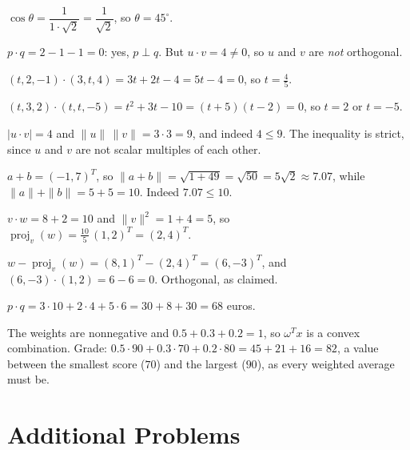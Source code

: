 \begin{solutions}
  \item $\cos \theta = \dfrac{1}{1 \cdot \sqrt{2}} = \dfrac{1}{\sqrt{2}}$,
        so $\theta = 45^{\circ}$.

  \item $p \cdot q = 2 - 1 - 1 = 0$: yes, $p \perp q$. But
        $u \cdot v = 4 \neq 0$, so $u$ and $v$ are \emph{not} orthogonal.

  \item $(t, 2, -1) \cdot (3, t, 4) = 3 t + 2 t - 4 = 5 t - 4 = 0$, so
        $t = \tfrac{4}{5}$.

  \item $(t, 3, 2) \cdot (t, t, -5) = t^{2} + 3 t - 10 = (t + 5)(t - 2)
        = 0$, so $t = 2$ or $t = -5$.

  \item $|u \cdot v| = 4$ and $\|u\| \, \|v\| = 3 \cdot 3 = 9$, and indeed
        $4 \le 9$. The inequality is strict, since $u$ and $v$ are not
        scalar multiples of each other.

  \item $a + b = (-1, 7)^{T}$, so
        $\|a + b\| = \sqrt{1 + 49} = \sqrt{50} = 5 \sqrt{2} \approx 7.07$,
        while $\|a\| + \|b\| = 5 + 5 = 10$. Indeed $7.07 \le 10$.

  \item $v \cdot w = 8 + 2 = 10$ and $\|v\|^{2} = 1 + 4 = 5$, so
        $\operatorname{proj}_{v}(w) = \tfrac{10}{5} \, (1, 2)^{T}
        = (2, 4)^{T}$.

  \item $w - \operatorname{proj}_{v}(w) = (8, 1)^{T} - (2, 4)^{T}
        = (6, -3)^{T}$, and $(6, -3) \cdot (1, 2) = 6 - 6 = 0$.
        Orthogonal, as claimed.

  \item $p \cdot q = 3 \cdot 10 + 2 \cdot 4 + 5 \cdot 6
        = 30 + 8 + 30 = 68$ euros.

  \item The weights are nonnegative and $0.5 + 0.3 + 0.2 = 1$, so
        $\omega^{T} x$ is a convex combination. Grade:
        $0.5 \cdot 90 + 0.3 \cdot 70 + 0.2 \cdot 80 = 45 + 21 + 16 = 82$,
        a value between the smallest score ($70$) and the largest
        ($90$), as every weighted average must be.
\end{solutions}

\section{Additional Problems}

